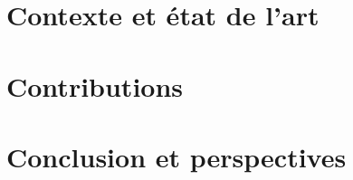 \documentclass{these-dbl}
\begin{document}



\clearemptydoublepage


\frontmatter
\clearemptydoublepage
\renewcommand{\contentsname}{Table des matières}
\tableofcontents %

\clearemptydoublepage


\clearemptydoublepage


\part{Contexte et état de l'art}
\label{part:one}

\clearemptydoublepage
\mainmatter


\clearemptydoublepage


\part{Contributions}
\label{part:two}

\clearemptydoublepage


\clearemptydoublepage


\clearemptydoublepage


\part{Conclusion et perspectives}
\label{part:three}

\clearemptydoublepage
\backmatter

\end{document}
